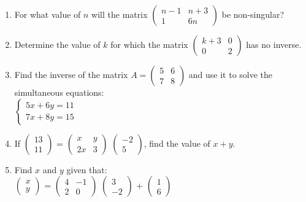\begin{enumerate}
	\item For what value of $n$ will the matrix $
	\begin{pmatrix}
	n - 1 & n + 3 \\
	1 & 6n
	\end{pmatrix}$ be non-singular?
	
	\item Determine the value of $k$ for which the matrix $
	\begin{pmatrix}
	k + 3 & 0 \\
	0 & 2
	\end{pmatrix}$ has no inverse.
	
	\item Find the inverse of the matrix $A = 
	\begin{pmatrix}
	5 & 6 \\
	7 & 8
	\end{pmatrix}$ and use it to solve the simultaneous equations:\\
	$\left\{
	\begin{array}{l}
	5x + 6y = 11\\
	7x + 8y = 15
	\end{array} \right.$
	
	\item If $ 
	\begin{pmatrix}
	13 \\
	11
	\end{pmatrix}$ = $
	\begin{pmatrix}
	x & y \\
	2x & 3
	\end{pmatrix}$ $ 
	\begin{pmatrix}
	-2 \\
	5
	\end{pmatrix}$, find the value of $x + y$.
	
	\item Find $x$ and $y$ given that:\\
	$ 
	\begin{pmatrix}
	x \\
	y
	\end{pmatrix}$ = $
	\begin{pmatrix}
	4 & -1 \\
	2 & 0
	\end{pmatrix}$ $ 
	\begin{pmatrix}
	3 \\
	-2
	\end{pmatrix}$ + $
	\begin{pmatrix}
	1 \\
	6
	\end{pmatrix}$
	

\end{enumerate}
